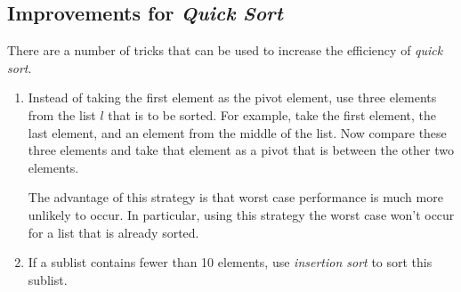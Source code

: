 \subsection{Improvements for \emph{Quick Sort}}
There are a number of tricks that can be used to increase the efficiency of \emph{quick sort}.
\begin{enumerate}
\item Instead of taking the first element as the pivot element, use three elements from the list
      $l$ that is to be sorted.  For example, take the first element, the last element, and an
      element from the middle of the list.  Now compare these three elements and take that element as
      a pivot that is between the other two elements.

      The advantage of this strategy is that  worst case performance is much more unlikely to occur.  In
      particular,  using this strategy the worst case won't occur for a list that is already
      sorted.
\item If a sublist contains fewer than 10 elements, use \emph{insertion sort} to sort this sublist.


\end{enumerate}

